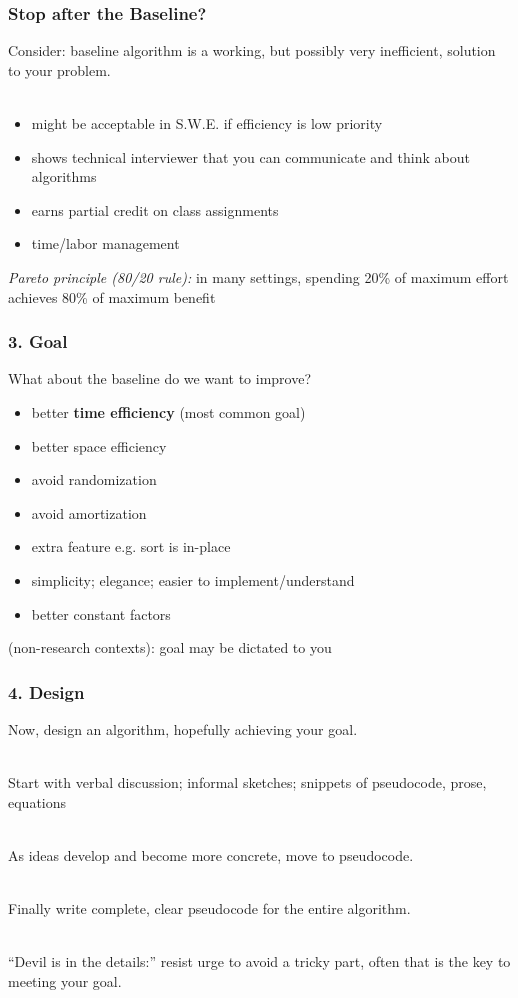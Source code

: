 \documentclass{beamer}
\newcommand{\stanza}{ \\~\ }
\begin{document}
\begin{frame} \frametitle{Stop after the Baseline?}
Consider: baseline algorithm is a working, but possibly very inefficient, solution to
your problem. \stanza
\begin{itemize}
  \item might be acceptable in S.W.E. if efficiency is low priority
  \item shows technical interviewer that you can communicate and think about
    algorithms
  \item earns partial credit on class assignments
  \item time/labor management
\end{itemize}
\vspace{.5cm}
\emph{Pareto principle (80/20 rule):} in many settings, spending 20\% of
maximum effort achieves 80\% of maximum benefit
\end{frame}

\begin{frame} \frametitle{3. Goal}
What about the baseline do we want to improve?
\begin{itemize}
  \item better \textbf{time efficiency} (most common goal)
  \item better space efficiency
  \item avoid randomization
  \item avoid amortization
  \item extra feature e.g. sort is in-place
  \item simplicity; elegance; easier to implement/understand
  \item better constant factors
\end{itemize}
(non-research contexts): goal may be dictated to you
\end{frame}

\begin{frame} \frametitle{4. Design}
Now, design an algorithm, hopefully achieving your goal. \stanza

Start with verbal discussion; informal sketches; snippets of pseudocode, prose,
equations \stanza

As ideas develop and become more concrete, move to pseudocode. \stanza

Finally write complete, clear pseudocode for the entire algorithm. \stanza

``Devil is in the details:'' resist urge to avoid a tricky part, often that
is the key to meeting your goal. \stanza
\end{frame}
\end{document}
